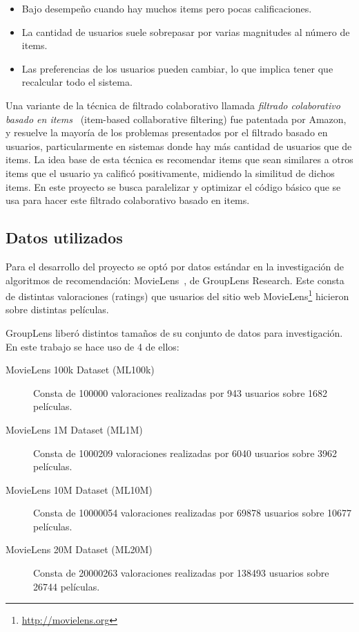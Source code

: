 \documentclass[11pt, a4paper]{article}
\begin{document}
  \begin{itemize}
    \item Bajo desempeño cuando hay muchos items pero pocas calificaciones.
    \item La cantidad de usuarios suele sobrepasar por varias magnitudes al
        número de items.
    \item Las preferencias de los usuarios pueden cambiar, lo que implica tener
        que recalcular todo el sistema.
  \end{itemize}

  Una variante de la técnica de filtrado colaborativo llamada {\em filtrado
  colaborativo basado en items}~\cite{linden2001collaborative} (item-based
  collaborative filtering) fue patentada por Amazon, y resuelve la mayoría de
  los problemas presentados por el filtrado basado en usuarios, particularmente
  en sistemas donde hay más cantidad de usuarios que de items. La idea base de
  esta técnica es recomendar items que sean similares a otros items que el
  usuario ya calificó positivamente, midiendo la similitud de dichos items. En
  este proyecto se busca paralelizar y optimizar el código básico que se usa
  para hacer este filtrado colaborativo basado en items.

  \subsection{Datos utilizados}

  Para el desarrollo del proyecto se optó por datos estándar en la
  investigación de algoritmos de recomendación:
  MovieLens~\cite{Harper:2015:MDH:2866565.2827872}, de GroupLens Research. Este
  consta de distintas valoraciones (ratings) que usuarios del sitio web
  MovieLens\footnote{\url{http://movielens.org}} hicieron sobre distintas
  películas.

  GroupLens liberó distintos tamaños de su conjunto de datos para
  investigación. En este trabajo se hace uso de 4 de ellos:

  \begin{description} 
      \item[MovieLens 100k Dataset (ML100k)] Consta de 100000 valoraciones
          realizadas por 943 usuarios sobre 1682 películas.
      \item[MovieLens 1M Dataset (ML1M)] Consta de 1000209 valoraciones
          realizadas por 6040 usuarios sobre 3962 películas.
      \item[MovieLens 10M Dataset (ML10M)] Consta de 10000054 valoraciones
          realizadas por 69878 usuarios sobre 10677 películas.
      \item[MovieLens 20M Dataset (ML20M)] Consta de 20000263 valoraciones
          realizadas por 138493 usuarios sobre 26744 películas.
  \end{description}
\end{document}
